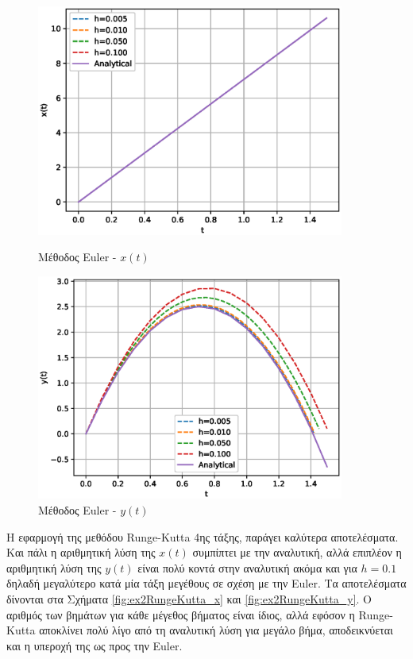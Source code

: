 \documentclass[assignment4.tex]{subfiles}
\begin{document}
\begin{figure}[hp]
	\includegraphics[width=0.9\textwidth]{ex2Euler_x.eps}
	\centering
	\caption{Μέθοδος \textlatin{Euler} - $x(t)$}
	\label{fig:ex2Euler_x}
	\includegraphics[width=0.9\textwidth]{ex2Euler_y.eps}
	\centering
	\caption{Μέθοδος \textlatin{Euler} - $y(t)$}
	\label{fig:ex2Euler_y}
\end{figure}

Η εφαρμογή της μεθόδου \textlatin{Runge-Kutta} 4ης τάξης, παράγει καλύτερα αποτελέσματα. Και πάλι η αριθμητική λύση της $x(t)$ συμπίπτει με την αναλυτική, αλλά επιπλέον η αριθμητική λύση της $y(t)$ είναι πολύ κοντά στην αναλυτική ακόμα και για $h=0.1$ δηλαδή μεγαλύτερο κατά μία τάξη μεγέθους σε σχέση με την \textlatin{Euler}. Τα αποτελέσματα δίνονται στα Σχήματα \ref{fig:ex2RungeKutta_x} και \ref{fig:ex2RungeKutta_y}. O αριθμός των βημάτων για κάθε μέγεθος βήματος είναι ίδιος, αλλά εφόσον η \textlatin{Runge-Kutta} αποκλίνει πολύ λίγο από τη αναλυτική λύση για μεγάλο βήμα, αποδεικνύεται και η υπεροχή της ως προς την \textlatin{Euler}.
\end{document}
